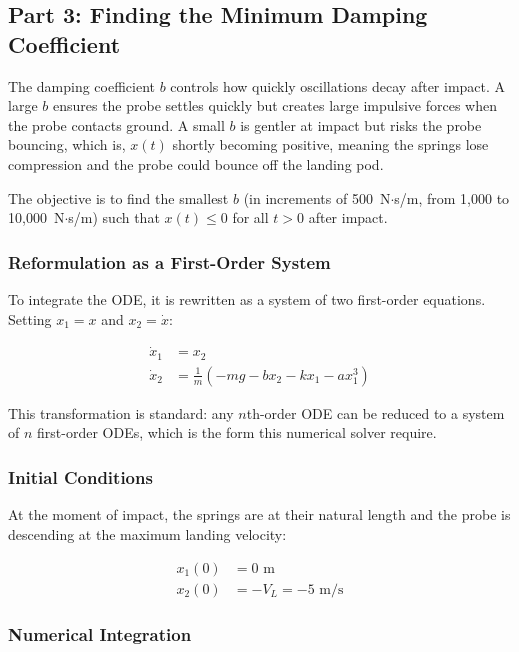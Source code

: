 \documentclass[12pt]{article}
\begin{document}
\subsection{Part 3: Finding the Minimum Damping Coefficient}

The damping coefficient $b$ controls how quickly oscillations decay after impact. A large $b$
ensures the probe settles quickly but creates large impulsive forces when the probe contacts ground.
A small $b$ is gentler at impact but risks the probe bouncing, which is, $x(t)$ shortly
becoming positive, meaning the springs lose compression and the probe could bounce off the
landing pod.

The objective is to find the smallest $b$ (in increments of 500~N$\cdot$s/m, from 1,000 to
10,000~N$\cdot$s/m) such that $x(t) \leq 0$ for all $t > 0$ after impact.

\subsubsection{Reformulation as a First-Order System}

To integrate the ODE, it is rewritten as a system of two first-order equations.
Setting $x_1 = x$ and $x_2 = \dot{x}$:

\begin{align*}
    \dot{x}_1 &= x_2 \\
    \dot{x}_2 &= \frac{1}{m}\left(-mg - bx_2 - kx_1 - ax_1^3\right)
\end{align*}

This transformation is standard: any $n$th-order ODE can be reduced to a system of $n$
first-order ODEs, which is the form this numerical solver require.

\subsubsection{Initial Conditions}

At the moment of impact, the springs are at their natural length and the probe is descending
at the maximum landing velocity:

\begin{align*}
    x_1(0) &= 0 \text{ m} \\
    x_2(0) &= -V_L = -5 \text{ m/s}
\end{align*}

\subsubsection{Numerical Integration}
\end{document}
